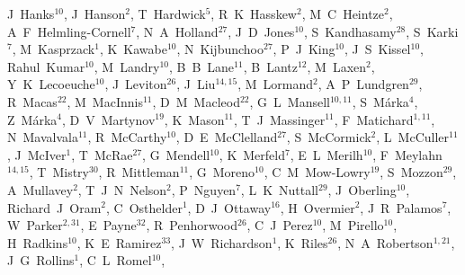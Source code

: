 \documentclass[12pt]{iopart}
\begin{document}
{J~Hanks$^{10}$,  %
J~Hanson$^{2}$,  %
T~Hardwick$^{5}$,  %
R~K~Hasskew$^{2}$,  %
M~C~Heintze$^{2}$,  %
A~F~Helmling-Cornell$^{7}$,  %
N~A~Holland$^{27}$,  %
J~D~Jones$^{10}$,  %
S~Kandhasamy$^{28}$,  %
S~Karki$^{7}$,  %
M~Kasprzack$^{1}$,  %
K~Kawabe$^{10}$,  %
N~Kijbunchoo$^{27}$,  %
P~J~King$^{10}$,  %
J~S~Kissel$^{10}$,  %
Rahul~Kumar$^{10}$,  %
M~Landry$^{10}$,  %
B~B~Lane$^{11}$,  %
B~Lantz$^{12}$,  %
M~Laxen$^{2}$,  %
Y~K~Lecoeuche$^{10}$,  %
J~Leviton$^{26}$,  %
J~Liu$^{14,15}$,  %
M~Lormand$^{2}$,  %
A~P~Lundgren$^{29}$,  %
R~Macas$^{22}$,  %
M~MacInnis$^{11}$,  %
D~M~Macleod$^{22}$,  %
G~L~Mansell$^{10,11}$,  %
S~M\'arka$^{4}$,  %
Z~M\'arka$^{4}$,  %
D~V~Martynov$^{19}$,  %
K~Mason$^{11}$,  %
T~J~Massinger$^{11}$,  %
F~Matichard$^{1,11}$,  %
N~Mavalvala$^{11}$,  %
R~McCarthy$^{10}$,  %
D~E~McClelland$^{27}$,  %
S~McCormick$^{2}$,  %
L~McCuller$^{11}$,  %
J~McIver$^{1}$,  %
T~McRae$^{27}$,  %
G~Mendell$^{10}$,  %
K~Merfeld$^{7}$,  %
E~L~Merilh$^{10}$,  %
F~Meylahn$^{14,15}$,  %
T~Mistry$^{30}$,  %
R~Mittleman$^{11}$,  %
G~Moreno$^{10}$,  %
C~M~Mow-Lowry$^{19}$,  %
S~Mozzon$^{29}$,  %
A~Mullavey$^{2}$,  %
T~J~N~Nelson$^{2}$,  %
P~Nguyen$^{7}$,  %
L~K~Nuttall$^{29}$,  %
J~Oberling$^{10}$,  %
Richard~J~Oram$^{2}$,  %
C~Osthelder$^{1}$,  %
D~J~Ottaway$^{16}$,  %
H~Overmier$^{2}$,  %
J~R~Palamos$^{7}$,  %
W~Parker$^{2,31}$,  %
E~Payne$^{32}$,  %
R~Penhorwood$^{26}$,  %
C~J~Perez$^{10}$,  %
M~Pirello$^{10}$,  %
H~Radkins$^{10}$,  %
K~E~Ramirez$^{33}$,  %
J~W~Richardson$^{1}$,  %
K~Riles$^{26}$,  %
N~A~Robertson$^{1,21}$,  %
J~G~Rollins$^{1}$,  %
C~L~Romel$^{10}$,  %
}
\end{document}
